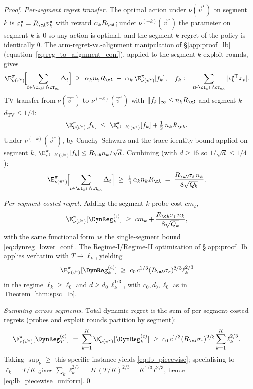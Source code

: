 \begin{proof}
\emph{Per-segment regret transfer.} The optimal action under
$\nu(\vec v^\star)$ on segment $k$ is $x_t^\star=R_\cA v_k^\star$ with
reward $\alpha_k R_\cA$; under $\nu^{(-k)}(\vec v^\star)$ the
parameter on segment $k$ is $0$ so any action is optimal, and the
segment-$k$ regret of the policy is identically $0$. The
arm-regret-vs.-alignment manipulation of \S\ref{app:proof_lb}
(equation~\eqref{eq:reg_to_alignment_conf}), applied to the segment-$k$
exploit rounds, gives
\[
\E^\pi_{\nu(\vec v^\star)}\!\Bigl[\sum_{t\in\cI_k\cap\cT_{\mathrm{ex}}}\Delta_t\Bigr]
\;\ge\;\alpha_k n_k R_\cA\;-\;\alpha_k\,\E^\pi_{\nu(\vec v^\star)}[f_k],\quad
f_k:=\sum_{t\in\cI_k\cap\cT_{\mathrm{ex}}}|v_k^{\star\top}x_t|.
\]
TV transfer from $\nu(\vec v^\star)$ to $\nu^{(-k)}(\vec v^\star)$
with $\|f_k\|_\infty\le n_k R_\cA$ and segment-$k$
$d_{\mathrm{TV}}\le 1/4$:
\[
\E^\pi_{\nu(\vec v^\star)}[f_k]\;\le\;\E^\pi_{\nu^{(-k)}(\vec v^\star)}[f_k]+\tfrac12\,n_k R_\cA.
\]
Under $\nu^{(-k)}(\vec v^\star)$, by Cauchy--Schwarz and the
trace-identity bound applied on segment $k$,
$\E^\pi_{\nu^{(-k)}(\vec v^\star)}[f_k]\le R_\cA n_k/\sqrt d$.
Combining (with $d\ge 16$ so $1/\sqrt d\le 1/4$):
\begin{equation}
\E^\pi_{\nu(\vec v^\star)}\!\Bigl[\sum_{t\in\cI_k\cap\cT_{\mathrm{ex}}}\Delta_t\Bigr]
\;\ge\;\tfrac14\,\alpha_k n_k R_\cA
\;=\;\frac{R_\cA\sigma_\varepsilon\,n_k}{8\sqrt{Q_k}}.
\label{eq:per_seg_regret_lb}
\end{equation}

\emph{Per-segment costed regret.} Adding the segment-$k$ probe cost
$cm_k$,
\[
\E^\pi_{\nu(\vec v^\star)}[\DynReg^{(c)}_k]
\;\ge\; cm_k + \frac{R_\cA\sigma_\varepsilon\,n_k}{8\sqrt{Q_k}},
\]
with the same functional form as the single-segment bound
\eqref{eq:dynreg_lower_conf}. The Regime-I/Regime-II optimization of
\S\ref{app:proof_lb} applies verbatim with $T\to\ell_k$, yielding
\[
\E^\pi_{\nu(\vec v^\star)}[\DynReg^{(c)}_k]
\;\ge\;c_0\,c^{1/3}(R_\cA\sigma_\varepsilon)^{2/3}\ell_k^{2/3}
\]
in the regime $\ell_k\ge\ell_0$ and $d\ge d_0\,\ell_k^{1/3}$, with
$c_0,d_0,\ell_0$ as in Theorem~\ref{thm:spsc_lb}.

\emph{Summing across segments.} Total dynamic regret is the sum of
per-segment costed regrets (probes and exploit rounds partition by
segment):
\[
\E^\pi_{\nu(\vec v^\star)}[\DynReg^{(c)}_T]
\;=\;\sum_{k=1}^K\E^\pi_{\nu(\vec v^\star)}[\DynReg^{(c)}_k]
\;\ge\;c_0\,c^{1/3}(R_\cA\sigma_\varepsilon)^{2/3}\sum_{k=1}^K\ell_k^{2/3}.
\]
Taking $\sup_\nu\ge$ this specific instance yields
\eqref{eq:lb_piecewise}; specialising to $\ell_k=T/K$ gives
$\sum_k\ell_k^{2/3}=K\,(T/K)^{2/3}=K^{1/3}T^{2/3}$, hence
\eqref{eq:lb_piecewise_uniform}.\qed
\end{proof}

